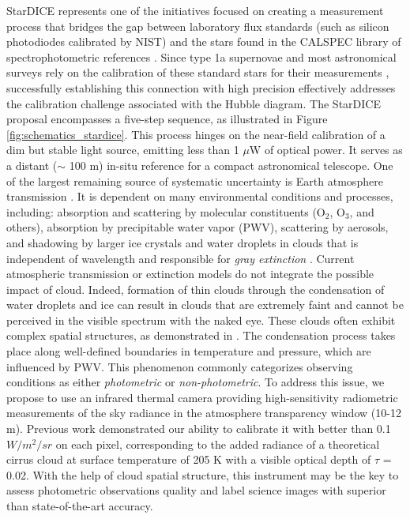 \documentclass[amt, article]{copernicus}
\begin{document}
StarDICE represents one of the initiatives focused on creating a measurement process that bridges the gap between laboratory flux standards (such as silicon photodiodes calibrated by NIST) and the stars found in the CALSPEC library of spectrophotometric references \citep{Bohlin2020}. Since type 1a supernovae and most astronomical  surveys rely on the calibration of these standard stars for their measurements \citep{Bohlin2011, Betoule2013, Rubin2015, Scolnic2015, Currie2020, Brout2022, rubin2022uniform}, successfully establishing this connection with high precision effectively addresses the calibration challenge associated with the Hubble diagram. The StarDICE proposal encompasses a five-step sequence, as illustrated in Figure \ref{fig:schematics_stardice}. This process hinges on the near-field calibration of a dim but stable light source, emitting less than 1 $\mu$W of optical power. It serves as a distant ($\sim$ 100 m) in-situ reference for a compact astronomical telescope.
One of the largest remaining source of systematic uncertainty is Earth atmosphere transmission \citep{stubbs2012addressing, Stubbs2015, Li2016}. It is dependent on many environmental conditions and processes, including: absorption and scattering by molecular constituents ($\text{O}_{2}$, $\text{O}_{3}$, and others), absorption by precipitable water vapor (PWV), scattering by aerosols, and shadowing by larger ice crystals and water droplets in clouds that is independent of wavelength and responsible for \textit{gray extinction} \citep{Burke2010, Burke2017}. Current atmospheric transmission or extinction models do not integrate the possible impact of cloud. Indeed, formation of thin clouds through the condensation of water droplets and ice can result in clouds that are extremely faint and cannot be perceived in the visible spectrum with the naked eye. These clouds often exhibit complex spatial structures, as demonstrated in \citealt{Burke2014}. The condensation process takes place along well-defined boundaries in temperature and pressure, which are influenced by PWV. This phenomenon commonly categorizes observing conditions as either \textit{photometric} or \textit{non-photometric}.
To address this issue, we propose to use an infrared thermal camera providing high-sensitivity radiometric measurements of the sky radiance in the atmosphere transparency window (10-12 \textmu m). Previous work demonstrated our ability to calibrate it with better than 0.1 $W/m^{2}/sr$ on each pixel, corresponding to the added radiance of a theoretical cirrus cloud at surface temperature of 205 K with a visible optical depth of $\tau$ = 0.02. With the help of cloud spatial structure, this instrument may be the key to assess photometric observations quality and label science images with superior than state-of-the-art accuracy.
\end{document}
